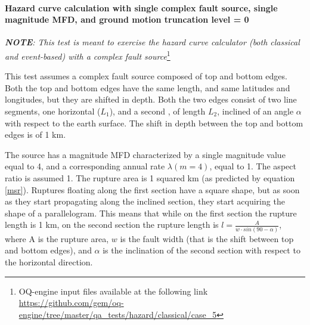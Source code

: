 \paragraph{Hazard curve calculation with single
complex fault source, single magnitude MFD, and ground motion truncation level =
0}
\textit{\textbf{NOTE}: This test is meant to exercise the hazard curve
calculator (both classical and event-based) with a complex fault source}\footnote{
    OQ-engine input files available at the following link
    \url{https://github.com/gem/oq-engine/tree/master/qa_tests/hazard/classical/case_5}} 

This test assumes a complex fault source composed of top and bottom edges. Both
the top and bottom edges have the same length, and same latitudes and
longitudes, but they are shifted in depth. 
Both the two edges consist of two line segments, one horizontal ($L_{1}$), and a
second , of length $L_{2}$, inclined of an angle $\alpha$ with respect to the
earth surface. The shift in depth between the top and bottom edges is of 1 km.

The source has a magnitude MFD characterized by a single magnitude
value equal to 4, and a corresponding annual rate $\lambda(m=4)$, equal to 1.
The aspect ratio is assumed 1. The rupture area is 1 squared km (as predicted
by equation \ref{msr}). Ruptures floating along the first section have a square
shape, but as soon as they start propagating along the inclined section, they
start acquiring the shape of a parallelogram.  
%
This means that while on the first section the rupture length is 1 km, on the
second section the rupture length is $l=\frac{A}{w\cdot sin(90 - \alpha)}$,
where A is the rupture area, $w$ is the fault width (that is the shift between
top and bottom edges), and $\alpha$ is the inclination of the second section
with respect to the horizontal direction.

